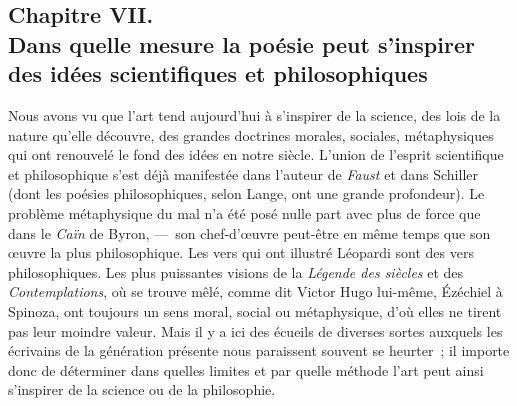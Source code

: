 \documentclass[french,twoside]{book} %
\begin{document}
\subsection[{Chapitre VII. Dans quelle mesure la poésie peut s’inspirer des idées scientifiques et philosophiques}]{Chapitre VII. \\
Dans quelle mesure la poésie peut s’inspirer des idées scientifiques et philosophiques}
\noindent  Nous avons vu que l’art tend aujourd’hui à s’inspirer de la science, des lois de la nature qu’elle découvre, des grandes doctrines morales, sociales, métaphysiques qui ont renouvelé le fond des idées en notre siècle. L’union de l’esprit scientifique et philosophique s’est déjà manifestée dans l’auteur de \emph{Faust} et dans Schiller (dont les poésies philosophiques, selon Lange, ont une grande profondeur). Le problème métaphysique du mal n’a été posé nulle part avec plus de force que dans le \emph{Caïn} de Byron, — son chef-d’œuvre peut-être en même temps que son œuvre la plus philosophique. Les vers qui ont illustré Léopardi sont des vers philosophiques. Les plus puissantes visions de la \emph{Légende des siècles} et des \emph{Contemplations}, où se trouve mêlé, comme dit Victor Hugo lui-même, Ézéchiel à Spinoza, ont toujours un sens moral, social ou métaphysique, d’où elles ne tirent pas leur moindre valeur. Mais il y a ici des écueils de diverses sortes auxquels les écrivains de la génération présente nous paraissent souvent se  heurter ; il importe donc de déterminer dans quelles limites et par quelle méthode l’art peut ainsi s’inspirer de la science ou de la philosophie.\par
\end{document}
